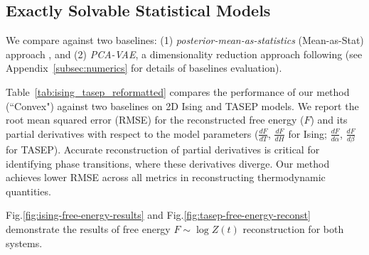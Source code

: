 \documentclass{article}
\theoremstyle{plain}
\theoremstyle{definition}
\theoremstyle{remark}
\begin{document}
\subsection{Exactly Solvable Statistical Models}

We compare against two baselines: (1) \textit{posterior-mean-as-statistics} (Mean-as-Stat) approach \cite{fearnhead2012constructing, jiang2017learning}, and (2) \textit{PCA-VAE}, a dimensionality reduction approach following \cite{walker2020deep} (see Appendix~\ref{subsec:numerics} for details of baselines evaluation).

Table~\ref{tab:ising_tasep_reformatted} compares the performance of our method (``Convex") against two baselines on 2D Ising and TASEP models. We report the root mean squared error (RMSE) for the reconstructed free energy ($F$) and its partial derivatives with respect to the model parameters ($\frac{dF}{dT}$, $\frac{dF}{dH}$ for Ising; $\frac{dF}{d\alpha}$, $\frac{dF}{d\beta}$ for TASEP). 
Accurate reconstruction of  partial derivatives is critical for identifying phase transitions, where these derivatives diverge. Our method achieves lower RMSE across all metrics in reconstructing thermodynamic quantities.

Fig.\ref{fig:ising-free-energy-results} and Fig.\ref{fig:tasep-free-energy-reconst} demonstrate the results of free energy $F \sim \log Z(t)$ reconstruction for both systems. 
\end{document}
